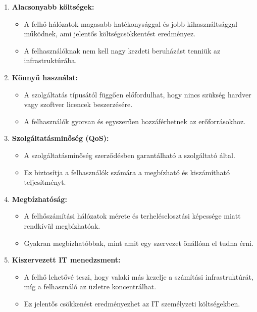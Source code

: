 \documentclass[a4paper,12pt]{article}
\begin{document}
    \begin{enumerate}
        \item \textbf{Alacsonyabb költségek:}
        \begin{itemize}
            \item A felhő hálózatok magasabb hatékonysággal és jobb kihasználtsággal működnek, ami jelentős költségcsökkentést eredményez.
            \item A felhasználóknak nem kell nagy kezdeti beruházást tenniük az infrastruktúrába.
        \end{itemize}

        \item \textbf{Könnyű használat:}
        \begin{itemize}
            \item A szolgáltatás típusától függően előfordulhat, hogy nincs szükség hardver vagy szoftver licencek beszerzésére.
            \item A felhasználók gyorsan és egyszerűen hozzáférhetnek az erőforrásokhoz.
        \end{itemize}

        \item \textbf{Szolgáltatásminőség (QoS):}
        \begin{itemize}
            \item A szolgáltatásminőség szerződésben garantálható a szolgáltató által.
            \item Ez biztosítja a felhasználók számára a megbízható és kiszámítható teljesítményt.
        \end{itemize}

        \item \textbf{Megbízhatóság:}
        \begin{itemize}
            \item A felhőszámítási hálózatok mérete és terheléselosztási képessége miatt rendkívül megbízhatóak.
            \item Gyakran megbízhatóbbak, mint amit egy szervezet önállóan el tudna érni.
        \end{itemize}

        \item \textbf{Kiszervezett IT menedzsment:}
        \begin{itemize}
            \item A felhő lehetővé teszi, hogy valaki más kezelje a számítási infrastruktúrát, míg a felhasználó az üzletre koncentrálhat.
            \item Ez jelentős csökkenést eredményezhet az IT személyzeti költségekben.
        \end{itemize}


\end{enumerate}
\end{document}

